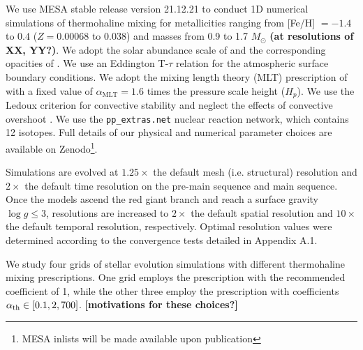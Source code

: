 %
%
%
We use MESA stable release version 21.12.21 to conduct 1D numerical simulations of thermohaline mixing for metallicities ranging from [Fe/H] $= -1.4$ to $0.4$ ($Z = 0.00068$ to $0.038$) and masses from 0.9 to 1.7 $M_{\odot}$ \textbf{(at resolutions of XX, YY?)}. We adopt the solar abundance scale of \citet{GrevesseSauval1998} and the corresponding opacities of \citet{IglesiasRogers1996}. We use an Eddington T-$\tau$ relation for the atmospheric surface boundary conditions.
We adopt the mixing length theory (MLT) prescription of \citet{Cox1980} with a fixed value of $\alpha_{\text{MLT}}= 1.6$ times the pressure scale height ($H_p$). We use the Ledoux criterion for convective stability and neglect the effects of convective overshoot \citep{Ledoux}. We use the \verb|pp_extras.net| nuclear reaction network, which contains 12 isotopes. Full details of our physical and numerical parameter choices are available on Zenodo\footnote{MESA inlists will be made available upon publication}. 

Simulations are evolved at $1.25\times$ the default mesh (i.e. structural) resolution and $2\times$ the default time resolution on the pre-main sequence and main sequence. Once the models ascend the red giant branch and reach a surface gravity $\log g \le 3$, resolutions are increased to $2\times$ the default spatial resolution and $10\times$ the default temporal resolution, respectively. Optimal resolution values were determined according to the convergence tests detailed in Appendix A.1. 

We study four grids of stellar evolution simulations with different thermohaline mixing prescriptions. One grid employs the \citet{brown_etal_2013} prescription with the recommended coefficient of 1, while the other three employ the \citet{kippenhahn_etal_1980} prescription with coefficients $\alpha_{\rm th} \in [0.1, 2, 700]$. \textbf{[motivations for these choices?]}

